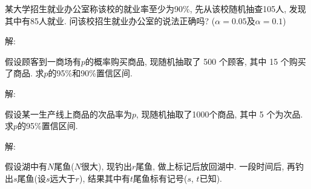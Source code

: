 \documentclass[standard]{ExBook}
\begin{document}
\begin{qitems}
\vspace{-5em}

    \begin{bbox}
    \begin{shaded}
        \qitem
某大学招生就业办公室称该校的就业率至少为90\%, 先从该校随机抽查105人, 发现其中有85人就业. 问该校招生就业办公室的说法正确吗? ($\alpha=0.05$及$\alpha=0.1$)
    \end{shaded}
    \end{bbox}

\vspace{-5em}

    \begin{bbox}
解: 
    \end{bbox}

\vspace{-5em}

    \begin{bbox}
    \begin{shaded}
        \qitem
假设顾客到一商场有$p$的概率购买商品, 现随机抽取了 500 个顾客, 其中 15 个购买了商品. 求$p$的95\%和90\%置信区间.
    \end{shaded}
    \end{bbox}

\vspace{-5em}

    \begin{bbox}
解: 
    \end{bbox}

\vspace{-5em}

    \begin{bbox}
    \begin{shaded}
        \qitem
假设某一生产线上商品的次品率为$p$, 现随机抽取了1000个商品, 其中 5 个为次品. 求$p$的95\%置信区间.
    \end{shaded}
    \end{bbox}

\vspace{-5em}

    \begin{bbox}
解: 
    \end{bbox}

\vspace{-5em}

    \begin{bbox}
    \begin{shaded}
        \qitem
假设湖中有$N$尾鱼($N$很大), 现钓出$r$尾鱼, 做上标记后放回湖中. 一段时间后, 再钓出$s$尾鱼(设$s$远大于$r$), 结果其中有$t$尾鱼标有记号($s$, $t$已知).


\end{shaded}
\end{bbox}
\end{qitems}
\end{document}
